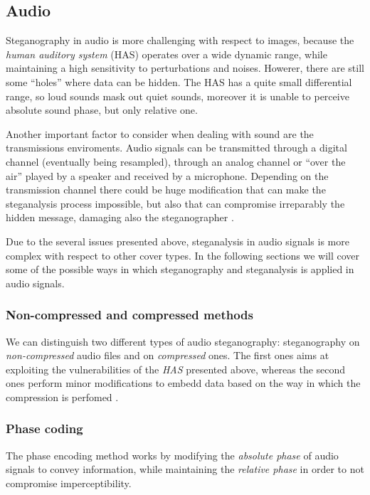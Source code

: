 \documentclass[../../main.tex]{subfiles}
\begin{document}
    \subsection{Audio}
    Steganography in audio is more challenging with respect to images, because
    the \emph{human auditory system} (HAS) operates over a wide dynamic range,
    while maintaining a high sensitivity to perturbations and noises.
    Howerer, there are still some ``holes'' where data can be hidden.
    The HAS has a quite small differential range, so loud sounds mask out quiet
    sounds, moreover it is unable to perceive absolute sound phase, but only
    relative one.

    Another important factor to consider when dealing with sound are the
    transmissions enviroments.
    Audio signals can be transmitted through a digital channel (eventually being
    resampled), through an analog channel or ``over the air'' played by a
    speaker and received by a microphone.
    Depending on the transmission channel there could be huge modification that
    can make the steganalysis process impossible, but also that can compromise
    irreparably the hidden message, damaging also the steganographer
    \cite{techniques-data-hiding}.

    Due to the several issues presented above, steganalysis in audio signals is
    more complex with respect to other cover types.
    In the following sections we will cover some of the possible ways in which
    steganography and steganalysis is applied in audio signals.

    \subsubsection{Non-compressed and compressed methods}
    We can distinguish two different types of audio steganography: steganography
    on \emph{non-compressed} audio files and on \emph{compressed} ones.
    The first ones aims at exploiting the vulnerabilities of the \emph{HAS}
    presented above, whereas the second ones perform minor modifications to
    embedd data based on the way in which the compression is perfomed
    \cite{review-audio-steganalysis}.

    \subsubsection{Phase coding}
    The phase encoding method works by modifying the \emph{absolute phase} of
    audio signals to convey information, while maintaining the \emph{relative
    phase} in order to not compromise imperceptibility.
\end{document}
